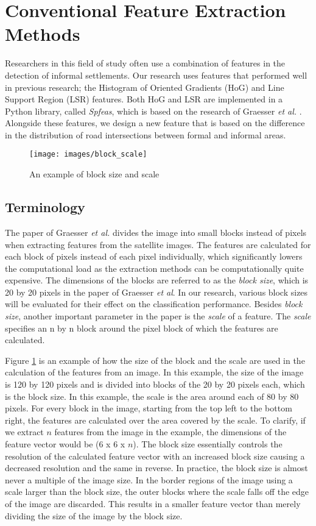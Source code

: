 \section{Conventional Feature Extraction Methods}
Researchers in this field of study often use a combination of features in the detection of informal settlements. Our research uses features that performed well in previous research;  the Histogram of Oriented Gradients (HoG) and Line Support Region (LSR) features. Both HoG and LSR are implemented in a Python library, called \textit{Spfeas}, which is based on the research of Graesser \textit{et al.} \cite{graesser2012image}. Alongside these features, we design a new feature that is based on the difference in the distribution of road intersections between formal and informal areas.

\begin{figure}
    \centering
    \texttt{[image: images/block\_scale]}
    \caption{An example of block size and scale}
    \label{fig:block_scale}
\end{figure}


\subsection{Terminology}
The paper of Graesser \textit{et al.} divides the image into small blocks instead of pixels when extracting features from the satellite images. The features are calculated for each block of pixels instead of each pixel individually, which significantly lowers the computational load as the extraction methods can be computationally quite expensive. The dimensions of the blocks are referred to as the \textit{block size},  which is 20 by 20 pixels in the paper of Graesser \textit{et al}. In our research, various block sizes will be evaluated for their effect on the classification performance. Besides \textit{block size}, another important parameter in the paper is the \textit{scale} of a feature. The \textit{scale} specifies an n by n block around the pixel block of which the features are calculated.

Figure \ref{fig:block_scale} is an example of how the size of the block and the scale are used in the calculation of the features from an image. In this example, the size of the image is 120 by 120 pixels and is divided into blocks of the 20 by 20 pixels each, which is the block size. In this example, the scale is the area around each of 80 by 80 pixels. For every block in the image, starting from the top left to the bottom right, the features are calculated over the area covered by the scale. To clarify, if we extract $n$ features from the image in the example, the dimensions of the feature vector would be (6 x 6 x $n$). The block size essentially controls the resolution of the calculated feature vector with an increased block size causing a decreased resolution and the same in reverse. In practice, the block size is almost never a multiple of the image size. In the border regions of the image using a scale larger than the block size, the outer blocks where the scale falls off the edge of the image are discarded. This results in a smaller feature vector than merely dividing the size of the image by the block size.

